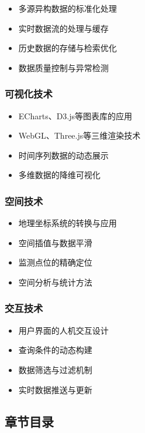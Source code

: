 \begin{itemize}
\tightlist
\item
  多源异构数据的标准化处理
\item
  实时数据流的处理与缓存
\item
  历史数据的存储与检索优化
\item
  数据质量控制与异常检测
\end{itemize}

\subsubsection{可视化技术}\label{ux53efux89c6ux5316ux6280ux672f}

\begin{itemize}
\tightlist
\item
  ECharts、D3.js等图表库的应用
\item
  WebGL、Three.js等三维渲染技术
\item
  时间序列数据的动态展示
\item
  多维数据的降维可视化
\end{itemize}

\subsubsection{空间技术}\label{ux7a7aux95f4ux6280ux672f}

\begin{itemize}
\tightlist
\item
  地理坐标系统的转换与应用
\item
  空间插值与数据平滑
\item
  监测点位的精确定位
\item
  空间分析与统计方法
\end{itemize}

\subsubsection{交互技术}\label{ux4ea4ux4e92ux6280ux672f}

\begin{itemize}
\tightlist
\item
  用户界面的人机交互设计
\item
  查询条件的动态构建
\item
  数据筛选与过滤机制
\item
  实时数据推送与更新
\end{itemize}

\subsection{章节目录}\label{ux7ae0ux8282ux76eeux5f55}

